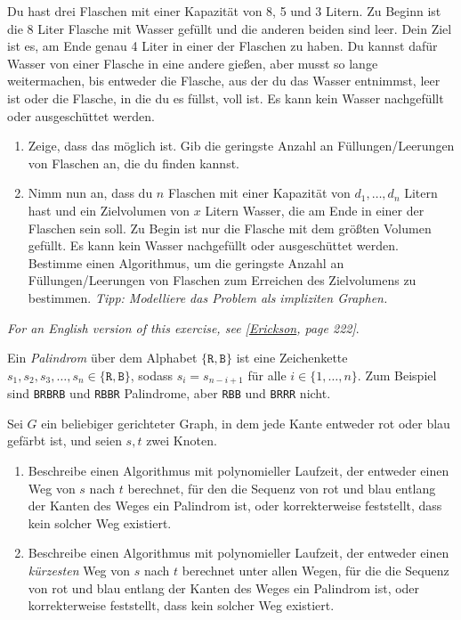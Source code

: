 \documentclass{uebung_cs}
\begin{document}
\begin{aufgabe}
Du hast drei Flaschen mit einer Kapazität von 8, 5 und 3 Litern.
Zu Beginn ist die 8 Liter Flasche mit Wasser gefüllt und die anderen beiden sind leer.
Dein Ziel ist es, am Ende genau 4 Liter in einer der Flaschen zu haben. Du kannst dafür Wasser von einer Flasche in eine andere gießen, aber musst so lange weitermachen, bis entweder die Flasche, aus der du das Wasser entnimmst, leer ist oder die Flasche, in die du es füllst, voll ist.
Es kann kein Wasser nachgefüllt oder ausgeschüttet werden.
\begin{enumerate}
	\item %
  Zeige, dass das möglich ist. Gib die geringste Anzahl an Füllungen/Leerungen von Flaschen an, die du finden kannst.
	\item %
  Nimm nun an, dass du $n$ Flaschen mit einer Kapazität von $d_1, \ldots, d_n$ Litern hast und ein Zielvolumen von $x$ Litern Wasser, die am Ende in einer der Flaschen sein soll.
	Zu Begin ist nur die Flasche mit dem größten Volumen gefüllt.
	Es kann kein Wasser nachgefüllt oder ausgeschüttet werden.\\
	Bestimme einen Algorithmus, um die geringste Anzahl an Füllungen/Leerungen von Flaschen zum Erreichen des Zielvolumens zu bestimmen.
	\textit{Tipp: Modelliere das Problem als impliziten Graphen.}
\end{enumerate}
\end{aufgabe}

\begin{aufgabe}
  \textit{\footnotesize For an English version of this exercise, see [\href{https://jeffe.cs.illinois.edu/teaching/algorithms/book/Algorithms-JeffE.pdf}{Erickson}, page 222]}.

  Ein \emph{Palindrom} über dem Alphabet $\{\texttt{R},\texttt{B}\}$ ist eine Zeichenkette $s_1,s_2,s_3,\dots,s_n\in\{\texttt{R},\texttt{B}\}$, sodass $s_i=s_{n-i+1}$ für alle $i\in\{1,\dots,n\}$. Zum Beispiel sind \texttt{BRBRB} und \texttt{RBBR} Palindrome, aber \texttt{RBB} und \texttt{BRRR} nicht.
  
  Sei $G$ ein beliebiger gerichteter Graph, in dem jede Kante entweder rot oder blau gefärbt ist, und seien $s,t$ zwei Knoten.
  \begin{enumerate}
      \item \mittel Beschreibe einen Algorithmus mit polynomieller Laufzeit, der entweder einen Weg von $s$ nach $t$ berechnet, für den die Sequenz von rot und blau entlang der Kanten des Weges ein Palindrom ist, oder korrekterweise feststellt, dass kein solcher Weg existiert.
      \item \note Beschreibe einen Algorithmus mit polynomieller Laufzeit, der entweder einen \emph{kürzesten} Weg von $s$ nach $t$ berechnet unter allen Wegen, für die die Sequenz von rot und blau entlang der Kanten des Weges ein Palindrom ist, oder korrekterweise feststellt, dass kein solcher Weg existiert.
  \end{enumerate}
  
\end{aufgabe}
\end{document}
